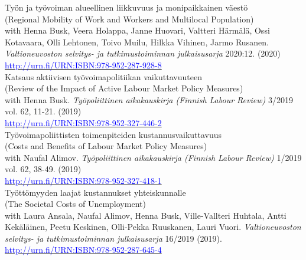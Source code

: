 \documentclass[16pt]{article}
\begin{document}
\noindent Ty\"{o}n ja ty\"{o}voiman alueellinen liikkuvuus ja monipaikkainen v\"{a}est\"{o} \\
\noindent (Regional Mobility of Work and Workers and Multilocal Population) \\
\noindent with Henna Busk, Veera Holappa, Janne Huovari, Valtteri H\"{a}rm\"{a}l\"{a}, Ossi Kotavaara, Olli Lehtonen, Toivo Muilu, Hilkka Vihinen, Jarmo Rusanen. \textit{Valtioneuvoston selvitys- ja tutkimustoiminnan julkaisusarja} 2020:12. (2020)  \\
\noindent \href{http://urn.fi/URN:ISBN:978-952-287-928-8}{\textcolor{blue}{http://urn.fi/URN:ISBN:978-952-287-928-8}} \\

\noindent Katsaus aktiivisen ty\"{o}voimapolitiikan vaikuttavuuteen \\
\noindent (Review of the Impact of Active Labour Market Policy Measures) \\
\noindent with Henna Busk. \textit{Ty\"{o}poliittinen aikakauskirja (Finnish Labour Review)} 3/2019 vol. 62, 11-21.  (2019) \\
\noindent \href{http://urn.fi/URN:ISBN:978-952-327-446-2}{\textcolor{blue}{http://urn.fi/URN:ISBN:978-952-327-446-2}} \\

\noindent Ty\"{o}voimapoliittisten toimenpiteiden kustannusvaikuttavuus \\
\noindent (Costs and Benefits of Labour Market Policy Measures) \\
\noindent with Naufal Alimov. \textit{Ty\"{o}poliittinen aikakauskirja (Finnish Labour Review)} 1/2019 vol. 62, 38-49.  (2019) \\
\noindent \href{http://urn.fi/URN:ISBN:978-952-287-645-4}{\textcolor{blue}{http://urn.fi/URN:ISBN:978-952-327-418-1}} \\

\noindent Ty\"{o}tt\"{o}myyden laajat kustannukset yhteiskunnalle \\
\noindent (The Societal Costs of Unemployment) \\
\noindent with Laura Ansala, Naufal Alimov, Henna Busk, Ville-Vallteri Huhtala, Antti Kek\"{a}l\"{a}inen, Peetu Keskinen, Olli-Pekka Ruuskanen, Lauri Vuori.  \textit{Valtioneuvoston selvitys- ja tutkimustoiminnan julkaisusarja} 16/2019 (2019).  \\
\noindent \href{http://urn.fi/URN:ISBN:978-952-287-645-4}{\textcolor{blue}{http://urn.fi/URN:ISBN:978-952-287-645-4}} \\
\end{document}
